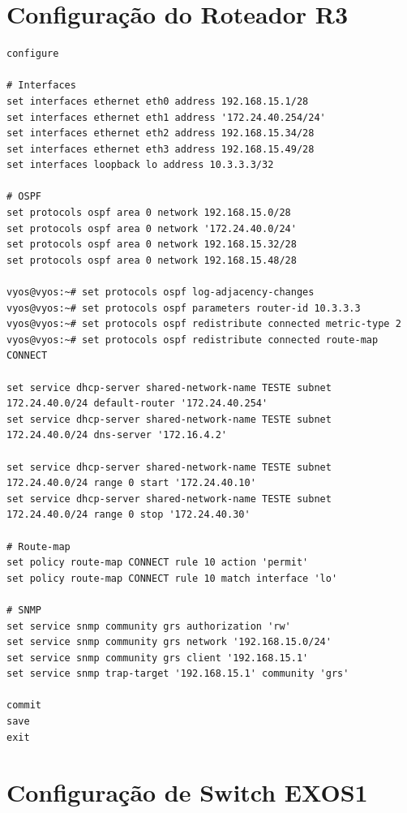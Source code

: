 \section{Configuração do Roteador R3}

\begin{listing}[H]
\centering
\begin{verbatim}
configure

# Interfaces
set interfaces ethernet eth0 address 192.168.15.1/28
set interfaces ethernet eth1 address '172.24.40.254/24'
set interfaces ethernet eth2 address 192.168.15.34/28
set interfaces ethernet eth3 address 192.168.15.49/28
set interfaces loopback lo address 10.3.3.3/32

# OSPF
set protocols ospf area 0 network 192.168.15.0/28
set protocols ospf area 0 network '172.24.40.0/24'
set protocols ospf area 0 network 192.168.15.32/28
set protocols ospf area 0 network 192.168.15.48/28

vyos@vyos:~# set protocols ospf log-adjacency-changes
vyos@vyos:~# set protocols ospf parameters router-id 10.3.3.3
vyos@vyos:~# set protocols ospf redistribute connected metric-type 2
vyos@vyos:~# set protocols ospf redistribute connected route-map CONNECT

set service dhcp-server shared-network-name TESTE subnet 172.24.40.0/24 default-router '172.24.40.254'
set service dhcp-server shared-network-name TESTE subnet 172.24.40.0/24 dns-server '172.16.4.2'

set service dhcp-server shared-network-name TESTE subnet 172.24.40.0/24 range 0 start '172.24.40.10'
set service dhcp-server shared-network-name TESTE subnet 172.24.40.0/24 range 0 stop '172.24.40.30'

# Route-map
set policy route-map CONNECT rule 10 action 'permit'
set policy route-map CONNECT rule 10 match interface 'lo'

# SNMP
set service snmp community grs authorization 'rw'
set service snmp community grs network '192.168.15.0/24'
set service snmp community grs client '192.168.15.1'
set service snmp trap-target '192.168.15.1' community 'grs'

commit
save
exit

\end{verbatim}
\caption{Configuração de Roteador R3}
\label{lst:rotR3}
\end{listing}

\section{Configuração de Switch EXOS1}

